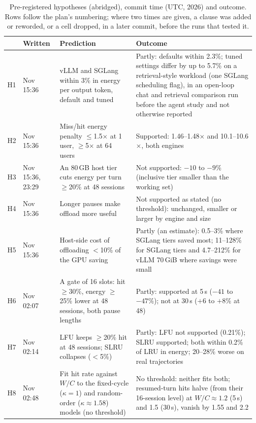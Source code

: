 \begin{table}[p]
\centering\footnotesize
\renewcommand{\arraystretch}{1.0}
\caption{Pre-registered hypotheses (abridged), commit time (UTC, 2026) and outcome. Rows follow the plan's numbering;
where two times are given, a clause was added or reworded, or a cell dropped, in a later commit, before the runs that tested it.}
\label{tab:prereg}
\begin{tabular}{p{}>{\raggedright\arraybackslash}p{}>{\raggedright\arraybackslash}p{}>{\raggedright\arraybackslash}p{}}
\toprule
& Written & Prediction & Outcome \\
\midrule
H1 & 5 Nov 15:36 & vLLM and SGLang within 3\% in energy per output token, default and tuned & Partly: defaults within 2.3\%; tuned settings differ by up to 5.7\% on a retrieval-style workload (one SGLang scheduling flag), in an open-loop chat and retrieval comparison run before the agent study and not otherwise reported \\
H2 & 5 Nov 15:36 & Miss/hit energy penalty $\le$1.5$\times$ at 1 user, $\ge$5$\times$ at 64 users & Supported: 1.46--1.48$\times$ and 10.1--10.6$\times$, both engines \\
H3 & 5 Nov 15:36, 23:29 & An 80\,GB host tier cuts energy per turn $\ge$20\% at 48 sessions & Not supported: $-10$ to $-9\%$ (inclusive tier smaller than the working set) \\
H4 & 5 Nov 15:36 & Longer pauses make offload more useful & Not supported as stated (no threshold): unchanged, smaller or larger by engine and size \\
H5 & 5 Nov 15:36 & Host-side cost of offloading $<$10\% of the GPU saving & Partly (an estimate): 0.5--3\% where SGLang tiers saved most; 11--128\% for SGLang tiers and 4.7--212\% for vLLM 70\,GiB where savings were small \\
H6 & 6 Nov 02:07 & A gate of 16 slots: hit $\ge$30\%, energy $\ge$25\% lower at 48 sessions, both pause lengths & Partly: supported at 5\,s ($-41$ to $-47\%$); not at 30\,s ($+6$ to $+8\%$ at 48) \\
H7 & 6 Nov 02:14 & LFU keeps $\ge$20\% hit at 48 sessions; SLRU collapses ($<$5\%) & Partly: LFU not supported (0.21\%); SLRU supported; both within 0.2\% of LRU in energy; 20--28\% worse on real trajectories \\
H8 & 6 Nov 02:48 & Fit hit rate against $W/C$ to the fixed-cycle ($\kappa=1$) and random-order ($\kappa\approx1.58$) models (no threshold) & No threshold: neither fits both; resumed-turn hits halve (from their 16-session level) at $W/C\approx1.2$ (5\,s) and 1.5 (30\,s), vanish by 1.55 and 2.2 \\

\end{tabular}
\end{table}
